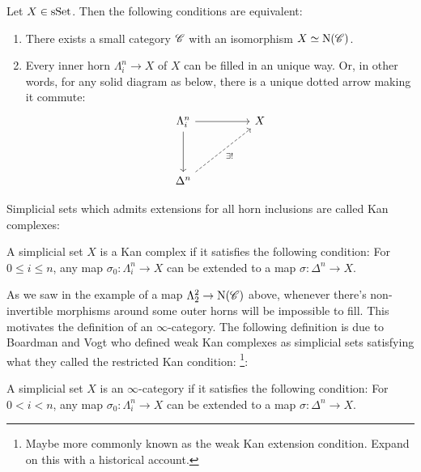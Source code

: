 \documentclass[../../thesis.tex]{subfiles}
\begin{document}
\begin{proposition}
    Let $X \in \mathrm{sSet}$.
    Then the following conditions are equivalent:
    \begin{enumerate}
        \item There exists a small category $\mathscr{C}$ with an isomorphism $X \simeq \mathrm{N}(\mathscr{C})$.
        \item Every inner horn $\Lambda_i^n \to X$ of $X$ can be filled in an unique way.
              Or, in other words, for any solid diagram as below, there is a unique dotted arrow making it commute:
              \[\begin{tikzcd}
                      {\Lambda_i^n} && X \\
                      \\
                      {\Delta^n}
                      \arrow[from=1-1, to=1-3]
                      \arrow[from=1-1, to=3-1]
                      \arrow["{\exists!}"', dashed, from=3-1, to=1-3]
                  \end{tikzcd}\]
    \end{enumerate}
\end{proposition}
Simplicial sets which admits extensions for all horn inclusions are called Kan complexes:
\begin{definition}
    A simplicial set $X$ is a Kan complex if it satisfies the following condition:
    For $0 \leq i \leq n$, any map $\sigma_0 : \Lambda_i^n \to X$ can be extended to a map $\sigma: \Delta^n \to X$.
\end{definition}
As we saw in the example of a map $\Lambda_2^2\to \mathrm{N}(\mathscr{C})$ above, whenever there's non-invertible morphisms around some outer horns will be impossible to fill.
This motivates the definition of an $\infty$-category.
The following definition is due to Boardman and Vogt \cite{BoardmanVogt} who defined weak Kan complexes as simplicial sets satisfying what they called the restricted Kan condition:
\footnote{Maybe more commonly known as the weak Kan extension condition. Expand on this with a historical account.}:
\begin{definition}
    A simplicial set $X$ is an $\infty$-category if it satisfies the following condition:
    For $0 < i < n$, any map $\sigma_0 : \Lambda_i^n \to X$ can be extended to a map $\sigma: \Delta^n \to X$.
\end{definition}
\end{document}
